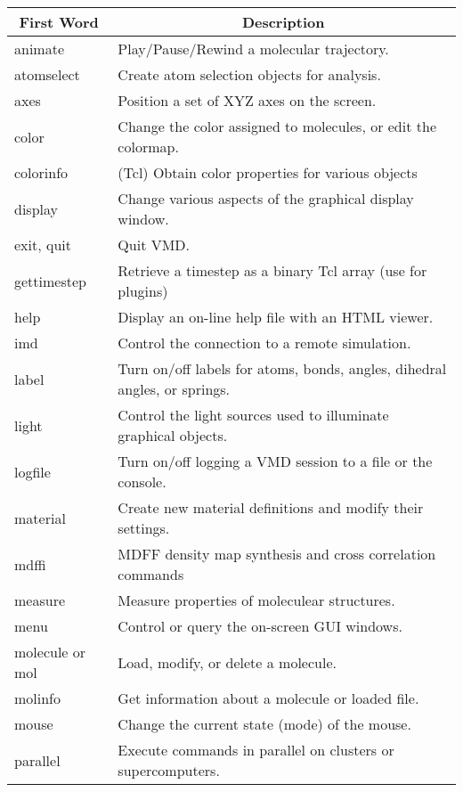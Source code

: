 \begin{table}[htp]
  \begin{tabular}{|l|l|} \hline
    \multicolumn{1}{|c}{First Word} &
	\multicolumn{1}{|c|}{Description} \\ \hline\hline
    animate	& Play/Pause/Rewind a molecular trajectory. \\
    atomselect  & Create atom selection objects for analysis. \\
    axes	& Position a set of XYZ axes on the screen. \\
    color	& Change the color assigned to molecules,
			or edit the colormap. \\
    colorinfo	& (Tcl) Obtain color properties for various objects \\
    display	& Change various aspects of the graphical display window. \\
    exit, quit	& Quit VMD. \\
    gettimestep & Retrieve a timestep as a binary Tcl array (use for plugins) \\
    help	& Display an on-line help file with an HTML viewer. \\
    imd         & Control the connection to a remote simulation. \\
    label	& Turn on/off labels for atoms, bonds, angles,
    dihedral angles, or springs. \\
    light	& Control the light sources used to illuminate
			graphical objects. \\
    logfile	& Turn on/off logging a VMD session to a file or the console. \\
    material    & Create new material definitions and modify their settings. \\
    mdffi       & MDFF density map synthesis and cross correlation commands \\
    measure     & Measure properties of moleculear structures. \\
    menu	& Control or query the on-screen GUI windows. \\
    molecule or mol	& Load, modify, or delete a molecule. \\
    molinfo     & Get information about a molecule or loaded file. \\
    mouse	& Change the current state (mode) of the mouse. \\
    parallel    & Execute commands in parallel on clusters or supercomputers.\\

\end{tabular}
\end{table}
